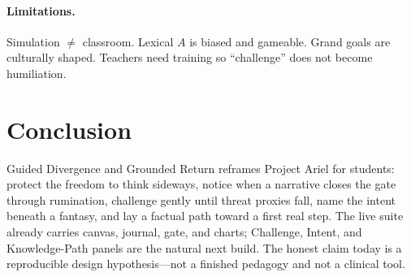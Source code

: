 \documentclass[11pt, a4paper]{article}
\begin{document}
\paragraph{Limitations.} Simulation $\neq$ classroom. Lexical $A$ is biased and gameable. Grand goals are culturally shaped. Teachers need training so ``challenge'' does not become humiliation.

\section{Conclusion}
Guided Divergence and Grounded Return reframes Project Ariel for students: protect the freedom to think sideways, notice when a narrative closes the gate through rumination, challenge gently until threat proxies fall, name the intent beneath a fantasy, and lay a factual path toward a first real step. The live suite already carries canvas, journal, gate, and charts; Challenge, Intent, and Knowledge-Path panels are the natural next build. The honest claim today is a reproducible design hypothesis---not a finished pedagogy and not a clinical tool.
\end{document}
